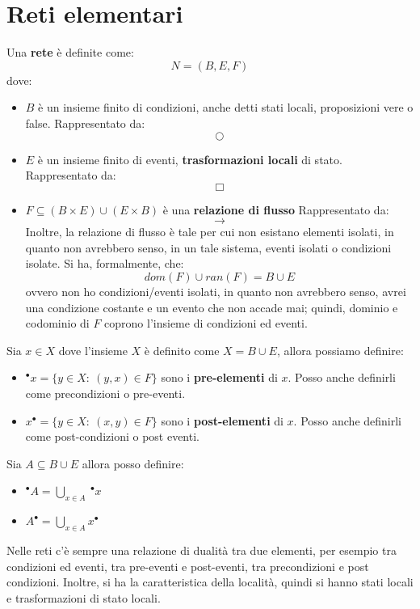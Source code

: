 \section{Reti elementari}
\begin{definizione}
    Una \textbf{rete} è definite come:
    \begin{equation}
        N = (B, E, F)
    \end{equation}
    dove:
    \begin{itemize}
        \item $B$ è un insieme finito di condizioni, anche detti stati locali, proposizioni vere o false. Rappresentato da: $$\bigcirc$$
        \item $E$ è un insieme finito di eventi, \textbf{trasformazioni locali} di stato. Rappresentato da: $$\Box$$
        \item $F \subseteq (B \times E) \cup (E \times B)$ è una \textbf{relazione di flusso} Rappresentato da: $$\to$$
        Inoltre, la relazione di flusso è tale per cui non esistano elementi isolati, in quanto non avrebbero senso, in un tale sistema, eventi isolati o condizioni isolate. Si ha, formalmente, che:
        \begin{equation}
            dom(F) \cup ran(F) = B \cup E
        \end{equation}
        ovvero non ho condizioni/eventi isolati, in quanto non avrebbero senso, avrei una condizione costante e un evento che non accade mai; quindi, dominio e codominio di $F$ coprono l’insieme di condizioni ed eventi.
    \end{itemize}
\end{definizione}
Sia $x \in X$ dove l'insieme $X$ è definito come $X = B \cup E$, allora possiamo definire:
\begin{itemize}
    \item $^{\bullet} x =\{y \in X: \ (y, x) \in F\}$ sono i \textbf{pre-elementi} di $x$. Posso anche definirli come precondizioni o pre-eventi.
    \item $x^{\bullet} =\{y \in X: \ (x, y) \in F\}$ sono i \textbf{post-elementi} di $x$. Posso anche definirli come post-condizioni o post eventi.
\end{itemize}
Sia $A \subseteq B \cup E$ allora posso definire:
\begin{itemize}
    \item $^{\bullet} A = \bigcup_{x \in A} \ ^{\bullet} x$
    \item $A^{\bullet} = \bigcup_{x \in A} x^{\bullet}$
\end{itemize}
Nelle reti c'è sempre una relazione di dualità tra due elementi, per esempio tra condizioni ed eventi, tra pre-eventi e post-eventi, tra precondizioni e post condizioni. Inoltre, si ha la caratteristica della località, quindi si hanno stati locali e trasformazioni di stato locali.

